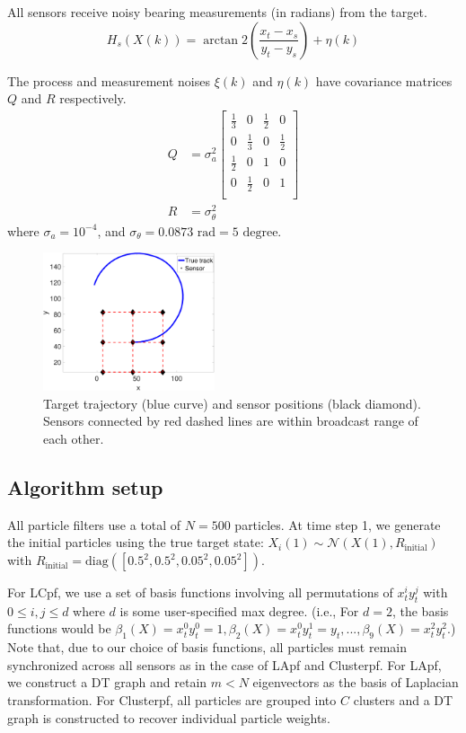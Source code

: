 \documentclass[10pt,letterpaper,final]{article}
\begin{document}
All sensors receive noisy bearing measurements (in radians) from the target.
\begin{equation}
H_s(X(k))= \arctan2 \left( \frac{x_t-x_s}{y_t-y_s} \right) + \eta(k)
\end{equation}

The process and measurement noises $\xi(k)$ and $\eta(k)$ have covariance matrices $Q$ and $R$ respectively.
\begin{align}
Q &= \sigma_a^2
\left[
\begin{array}{cccc}
\frac{1}{3} & 0 & \frac{1}{2} & 0 \\
0 & \frac{1}{3} & 0 & \frac{1}{2} \\
\frac{1}{2} & 0 & 1 & 0 \\
0 & \frac{1}{2} & 0 & 1 \\
\end{array}
\right]\\
R &= \sigma_{\theta}^2
\end{align}
where $\sigma_a=10^{-4}$, and $\sigma_{\theta}=0.0873\text{ rad} = 5 \text{ degree}$.

\begin{figure}
\centering
\includegraphics[width=0.45\textwidth]{Figures/track}
\caption{Target trajectory (blue curve) and sensor positions (black diamond). Sensors connected by red dashed lines are within broadcast range of each other.}
\label{fig:track}
\end{figure}

\subsection{Algorithm setup}
All particle filters use a total of $N=500$ particles. At time step 1, we generate the initial particles using the true target state: $X_i(1) \sim \mathcal{N}(X(1), R_{\text{initial}})$ with $R_{\text{initial}}=\text{diag}([0.5^2,0.5^2,0.05^2,0.05^2])$. 

For LCpf, we use a set of basis functions involving all permutations of $x_t^iy_t^j$ with $0\leq i, j \leq d$ where $d$ is some user-specified max degree. (i.e., For $d=2$, the basis functions would be $\beta_1(X) = x_t^0 y_t^0 = 1, \beta_2(X) = x_t^0 y_t^1 = y_t, ..., \beta_9(X) = x_t^2 y_t^2 $.) Note that, due to our choice of basis functions, all particles must remain synchronized across all sensors as in the case of LApf and Clusterpf. For LApf, we construct a DT graph and retain $m< N$ eigenvectors as the basis of Laplacian transformation. For Clusterpf, all particles are grouped into $C$ clusters and a DT graph is constructed to recover individual particle weights. 
\end{document}
